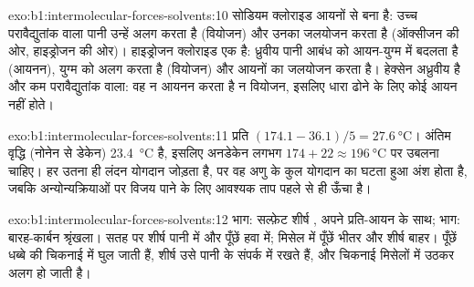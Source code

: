 \begin{solution}{exo:b1:intermolecular-forces-solvents:10}
सोडियम क्लोराइड आयनों से बना है: उच्च परावैद्युतांक वाला पानी उन्हें
अलग करता है (वियोजन) और उनका जलयोजन करता है (ऑक्सीजन  की ओर, हाइड्रोजन
 की ओर)। हाइड्रोजन क्लोराइड एक  है: ध्रुवीय पानी
 आबंध को आयन-युग्म  में बदलता है (आयनन),
युग्म को अलग करता है (वियोजन) और आयनों का जलयोजन करता है। हेक्सेन अध्रुवीय है
और कम परावैद्युतांक वाला: वह न आयनन करता है न वियोजन, इसलिए धारा ढोने के लिए
कोई आयन नहीं होते।
\end{solution}

\begin{solution}{exo:b1:intermolecular-forces-solvents:11}
प्रति  $(174.1 - 36.1)/5 = \qty{27.6}{\celsius}$। अंतिम
वृद्धि (नोनेन से डेकेन) \qty{23.4}{\celsius} है, इसलिए अनडेकेन लगभग
$174 + 22 \approx \qty{196}{\celsius}$ पर उबलना चाहिए। हर  उतना ही
लंदन योगदान जोड़ता है, पर वह अणु के कुल योगदान का घटता हुआ
अंश होता है, जबकि अन्योन्यक्रियाओं पर विजय पाने के लिए आवश्यक ताप
पहले से ही ऊँचा है।
\end{solution}

\begin{solution}{exo:b1:intermolecular-forces-solvents:12}
 भाग: सल्फ़ेट शीर्ष , अपने  प्रति-आयन के साथ;
 भाग: बारह-कार्बन श्रृंखला। सतह पर शीर्ष
पानी में और पूँछें हवा में; मिसेल में पूँछें भीतर और शीर्ष बाहर।
पूँछें धब्बे की चिकनाई में घुल जाती हैं, शीर्ष उसे पानी के संपर्क में
रखते हैं, और चिकनाई मिसेलों में उठकर अलग हो जाती है।
\end{solution}

